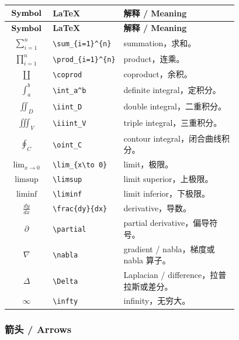 \documentclass[11pt]{article}
\begin{document}
\begin{longtable}{>{$}c<{$} p{0.28\linewidth} p{0.50\linewidth}}
\hline
\text{\textbf{Symbol}} & \textbf{LaTeX} & \textbf{解释 / Meaning} \\
\hline
\endfirsthead
\hline
\text{\textbf{Symbol}} & \textbf{LaTeX} & \textbf{解释 / Meaning} \\
\hline
\endhead
\sum_{i=1}^{n} & \verb|\sum_{i=1}^{n}| & summation，求和。 \\
\prod_{i=1}^{n} & \verb|\prod_{i=1}^{n}| & product，连乘。 \\
\coprod & \verb|\coprod| & coproduct，余积。 \\
\int_a^b & \verb|\int_a^b| & definite integral，定积分。 \\
\iint_D & \verb|\iint_D| & double integral，二重积分。 \\
\iiint_V & \verb|\iiint_V| & triple integral，三重积分。 \\
\oint_C & \verb|\oint_C| & contour integral，闭合曲线积分。 \\
\lim_{x\to 0} & \verb|\lim_{x\to 0}| & limit，极限。 \\
\limsup & \verb|\limsup| & limit superior，上极限。 \\
\liminf & \verb|\liminf| & limit inferior，下极限。 \\
\frac{dy}{dx} & \verb|\frac{dy}{dx}| & derivative，导数。 \\
\partial & \verb|\partial| & partial derivative，偏导符号。 \\
\nabla & \verb|\nabla| & gradient / nabla，梯度或 nabla 算子。 \\
\Delta & \verb|\Delta| & Laplacian / difference，拉普拉斯或差分。 \\
\infty & \verb|\infty| & infinity，无穷大。 \\
\hline
\end{longtable}

\subsubsection{箭头 / Arrows}
\end{document}
